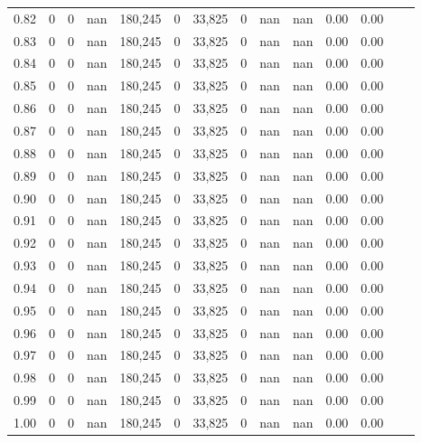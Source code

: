 \begin{tabular}{rrrrrrrrrrrrrr}
0.82 &        0 &       0 &     nan &  180,245 &        0 &  33,825 &       0 &   nan &   nan &  0.00 &      0.00 \\
0.83 &        0 &       0 &     nan &  180,245 &        0 &  33,825 &       0 &   nan &   nan &  0.00 &      0.00 \\
0.84 &        0 &       0 &     nan &  180,245 &        0 &  33,825 &       0 &   nan &   nan &  0.00 &      0.00 \\
0.85 &        0 &       0 &     nan &  180,245 &        0 &  33,825 &       0 &   nan &   nan &  0.00 &      0.00 \\
0.86 &        0 &       0 &     nan &  180,245 &        0 &  33,825 &       0 &   nan &   nan &  0.00 &      0.00 \\
0.87 &        0 &       0 &     nan &  180,245 &        0 &  33,825 &       0 &   nan &   nan &  0.00 &      0.00 \\
0.88 &        0 &       0 &     nan &  180,245 &        0 &  33,825 &       0 &   nan &   nan &  0.00 &      0.00 \\
0.89 &        0 &       0 &     nan &  180,245 &        0 &  33,825 &       0 &   nan &   nan &  0.00 &      0.00 \\
0.90 &        0 &       0 &     nan &  180,245 &        0 &  33,825 &       0 &   nan &   nan &  0.00 &      0.00 \\
0.91 &        0 &       0 &     nan &  180,245 &        0 &  33,825 &       0 &   nan &   nan &  0.00 &      0.00 \\
0.92 &        0 &       0 &     nan &  180,245 &        0 &  33,825 &       0 &   nan &   nan &  0.00 &      0.00 \\
0.93 &        0 &       0 &     nan &  180,245 &        0 &  33,825 &       0 &   nan &   nan &  0.00 &      0.00 \\
0.94 &        0 &       0 &     nan &  180,245 &        0 &  33,825 &       0 &   nan &   nan &  0.00 &      0.00 \\
0.95 &        0 &       0 &     nan &  180,245 &        0 &  33,825 &       0 &   nan &   nan &  0.00 &      0.00 \\
0.96 &        0 &       0 &     nan &  180,245 &        0 &  33,825 &       0 &   nan &   nan &  0.00 &      0.00 \\
0.97 &        0 &       0 &     nan &  180,245 &        0 &  33,825 &       0 &   nan &   nan &  0.00 &      0.00 \\
0.98 &        0 &       0 &     nan &  180,245 &        0 &  33,825 &       0 &   nan &   nan &  0.00 &      0.00 \\
0.99 &        0 &       0 &     nan &  180,245 &        0 &  33,825 &       0 &   nan &   nan &  0.00 &      0.00 \\
1.00 &        0 &       0 &     nan &  180,245 &        0 &  33,825 &       0 &   nan &   nan &  0.00 &      0.00 \\
\bottomrule
\end{tabular}
